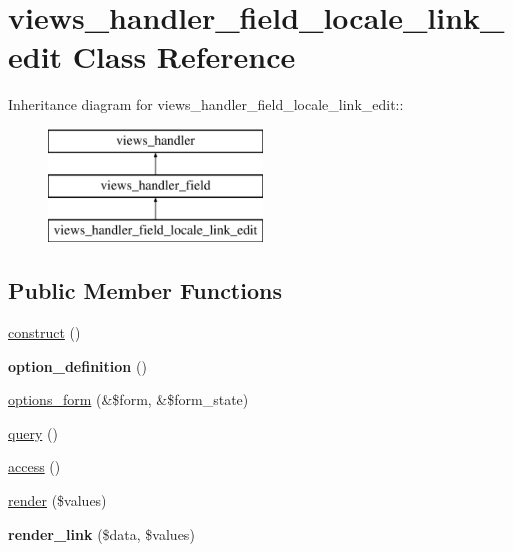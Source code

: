 \hypertarget{classviews__handler__field__locale__link__edit}{
\section{views\_\-handler\_\-field\_\-locale\_\-link\_\-edit Class Reference}
\label{classviews__handler__field__locale__link__edit}
}
Inheritance diagram for views\_\-handler\_\-field\_\-locale\_\-link\_\-edit::\begin{figure}[H]
\begin{center}
\leavevmode
\includegraphics[height=3cm]{classviews__handler__field__locale__link__edit}
\end{center}
\end{figure}
\subsection*{Public Member Functions}
\begin{DoxyCompactItemize}
\item 
\hyperlink{classviews__handler__field__locale__link__edit_a6f7db94c0dc07564c1853fd7ef153a6e}{construct} ()
\item 
\hypertarget{classviews__handler__field__locale__link__edit_ab96dd9ff121303f96d4f9cdbbb3ca906}{
{\bfseries option\_\-definition} ()}
\label{classviews__handler__field__locale__link__edit_ab96dd9ff121303f96d4f9cdbbb3ca906}

\item 
\hyperlink{classviews__handler__field__locale__link__edit_adcbd4b327f8cbcd2d75e0c145b00e42d}{options\_\-form} (\&\$form, \&\$form\_\-state)
\item 
\hyperlink{classviews__handler__field__locale__link__edit_ada85b88e681ca38a7c7d66deb133ae65}{query} ()
\item 
\hyperlink{classviews__handler__field__locale__link__edit_aef9bc33a9c15cd4a9b6958445762a703}{access} ()
\item 
\hyperlink{classviews__handler__field__locale__link__edit_aea9a4b5bf4281c17e787bae9fee408bd}{render} (\$values)
\item 
\hypertarget{classviews__handler__field__locale__link__edit_a5bbbea7b6ba6fe30554f2e902751b97a}{
{\bfseries render\_\-link} (\$data, \$values)}
\label{classviews__handler__field__locale__link__edit_a5bbbea7b6ba6fe30554f2e902751b97a}

\end{DoxyCompactItemize}


